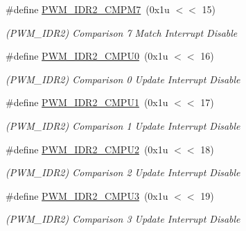 \begin{DoxyCompactItemize}
\mbox{\label{group__SAME70__PWM_gabc7b93057992ff6fc2052969a73a7654}} 
\#define \mbox{\hyperlink{group__SAME70__PWM_gabc7b93057992ff6fc2052969a73a7654}{P\+W\+M\+\_\+\+I\+D\+R2\+\_\+\+C\+M\+P\+M7}}~(0x1u $<$$<$ 15)
\begin{DoxyCompactList}\small\item\em (P\+W\+M\+\_\+\+I\+D\+R2) Comparison 7 Match Interrupt Disable \end{DoxyCompactList}\item 
\mbox{\label{group__SAME70__PWM_ga127c7d3f21eebb3c2404e5295c373567}} 
\#define \mbox{\hyperlink{group__SAME70__PWM_ga127c7d3f21eebb3c2404e5295c373567}{P\+W\+M\+\_\+\+I\+D\+R2\+\_\+\+C\+M\+P\+U0}}~(0x1u $<$$<$ 16)
\begin{DoxyCompactList}\small\item\em (P\+W\+M\+\_\+\+I\+D\+R2) Comparison 0 Update Interrupt Disable \end{DoxyCompactList}\item 
\mbox{\label{group__SAME70__PWM_ga5c5a299736bbcce28d62a005a967fd6d}} 
\#define \mbox{\hyperlink{group__SAME70__PWM_ga5c5a299736bbcce28d62a005a967fd6d}{P\+W\+M\+\_\+\+I\+D\+R2\+\_\+\+C\+M\+P\+U1}}~(0x1u $<$$<$ 17)
\begin{DoxyCompactList}\small\item\em (P\+W\+M\+\_\+\+I\+D\+R2) Comparison 1 Update Interrupt Disable \end{DoxyCompactList}\item 
\mbox{\label{group__SAME70__PWM_ga8c4148bf2bb9caba0bcab82cd29f5019}} 
\#define \mbox{\hyperlink{group__SAME70__PWM_ga8c4148bf2bb9caba0bcab82cd29f5019}{P\+W\+M\+\_\+\+I\+D\+R2\+\_\+\+C\+M\+P\+U2}}~(0x1u $<$$<$ 18)
\begin{DoxyCompactList}\small\item\em (P\+W\+M\+\_\+\+I\+D\+R2) Comparison 2 Update Interrupt Disable \end{DoxyCompactList}\item 
\mbox{\label{group__SAME70__PWM_ga07119f650f026cfc4c411d07c1944889}} 
\#define \mbox{\hyperlink{group__SAME70__PWM_ga07119f650f026cfc4c411d07c1944889}{P\+W\+M\+\_\+\+I\+D\+R2\+\_\+\+C\+M\+P\+U3}}~(0x1u $<$$<$ 19)
\begin{DoxyCompactList}\small\item\em (P\+W\+M\+\_\+\+I\+D\+R2) Comparison 3 Update Interrupt Disable \end{DoxyCompactList}\item 
$$
\end{DoxyCompactItemize}

